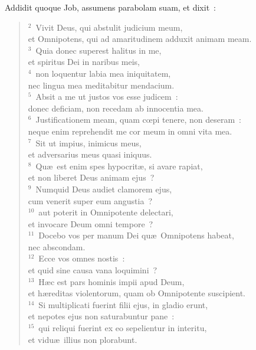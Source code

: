\lettrine[lines=3,image=true,loversize=0.05,lraise=-0.03]{A}{}ddidit quoque Job, assumens parabolam suam, et dixit~:
\begin{flushleft}\begin{verse}\vspace{6pt}${}^{2}$~Vivit Deus, qui abstulit judicium meum,\\ et Omnipotens, qui ad amaritudinem adduxit animam meam.\\
${}^{3}$~Quia donec superest halitus in me,\\ et spiritus Dei in naribus meis,\\
${}^{4}$~non loquentur labia mea iniquitatem,\\ nec lingua mea meditabitur mendacium.\\
${}^{5}$~Absit a me ut justos vos esse judicem~:\\ donec deficiam, non recedam ab innocentia mea.\\
${}^{6}$~Justificationem meam, quam cœpi tenere, non deseram~:\\ neque enim reprehendit me cor meum in omni vita mea.\\
${}^{7}$~Sit ut impius, inimicus meus,\\ et adversarius meus quasi iniquus.\\
${}^{8}$~Qu\ae\ est enim spes hypocrit\ae , si avare rapiat,\\ et non liberet Deus animam ejus~?\\
${}^{9}$~Numquid Deus audiet clamorem ejus,\\ cum venerit super eum angustia~?\\
${}^{10}$~aut poterit in Omnipotente delectari,\\ et invocare Deum omni tempore~?\\
${}^{11}$~Docebo vos per manum Dei qu\ae\ Omnipotens habeat,\\ nec abscondam.\\
${}^{12}$~Ecce vos omnes nostis~:\\ et quid sine causa vana loquimini~?\\
${}^{13}$~H\ae c est pars hominis impii apud Deum,\\ et h\ae reditas violentorum, quam ob Omnipotente suscipient.\\
${}^{14}$~Si multiplicati fuerint filii ejus, in gladio erunt,\\ et nepotes ejus non saturabuntur pane~:\\
${}^{15}$~qui reliqui fuerint ex eo sepelientur in interitu,\\ et vidu\ae\ illius non plorabunt.\\

\end{verse}
\end{flushleft}
